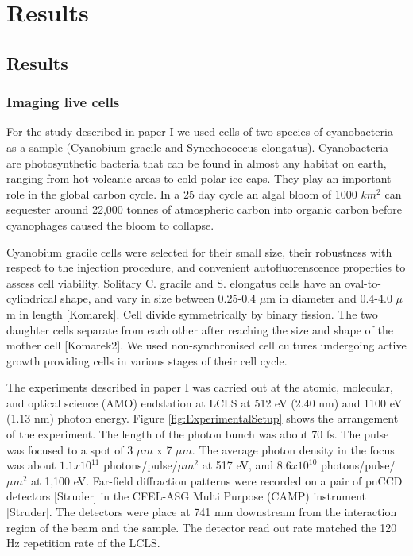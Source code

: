 \part{Results}
\chapter{Results}
\section{Imaging live cells}
For the study described in paper I we used cells of two species of cyanobacteria as a sample (Cyanobium gracile and Synechococcus elongatus). Cyanobacteria are photosynthetic bacteria that can be found in almost any habitat on earth, ranging from hot volcanic areas to cold polar ice caps. They play an important role in the global carbon cycle. In a 25 day cycle an algal bloom of 1000 $km^2$ can sequester around 22,000 tonnes of atmospheric carbon into organic carbon before cyanophages caused the bloom to collapse.
 
Cyanobium gracile cells were selected for their small size, their robustness with respect to the injection procedure, and convenient autofluorenscence properties to assess cell viability. Solitary C. gracile and S. elongatus cells have an oval-to-cylindrical shape, and vary in size between 0.25-0.4 $\mu$m in diameter and 0.4-4.0 $\mu$m in length [Komarek]. Cell divide symmetrically by binary fission. The two daughter cells separate from each other after reaching the size and shape of the mother cell [Komarek2]. We used non-synchronised cell cultures undergoing active growth providing cells in various stages of their cell cycle. 

The experiments described in paper I was carried out at the atomic, molecular, and optical science (AMO) endstation at LCLS at 512 eV (2.40 nm) and 1100 eV (1.13 nm) photon energy.  Figure \ref{fig:ExperimentalSetup} shows the arrangement of the experiment. The length of the photon bunch was about 70 fs. The pulse was focused to a spot of 3 $\mu m$ x 7 $\mu m$. The average photon density in the focus was about $1.1 x 10^{11}$ photons/pulse/$\mu m^2$ at 517 eV, and $8.6 x 10^{10}$ photons/pulse/$\mu m^2$ at 1,100 eV. Far-field diffraction patterns were recorded on a pair of pnCCD detectors [Struder] in the CFEL-ASG Multi Purpose (CAMP) instrument [Struder]. The detectors were place at 741 mm downstream from the interaction region of the beam and the sample. The detector read out rate matched the 120 Hz repetition rate of the LCLS. 

